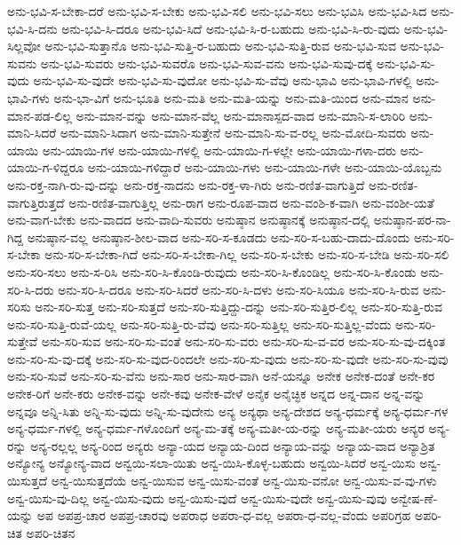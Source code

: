 {ಅನು-ಭವಿ-ಸ-ಬೇಕಾ-ದರೆ
ಅನು-ಭವಿ-ಸ-ಬೇಕು
ಅನು-ಭವಿ-ಸಲಿ
ಅನು-ಭವಿ-ಸಲು
ಅನು-ಭವಿಸಿ
ಅನು-ಭವಿ-ಸಿದ
ಅನು-ಭವಿ-ಸಿ-ದನು
ಅನು-ಭವಿ-ಸಿ-ದರೂ
ಅನು-ಭವಿ-ಸಿದೆ
ಅನು-ಭವಿ-ಸಿ-ರ-ಬಹುದು
ಅನು-ಭವಿ-ಸಿ-ರು-ವುದು
ಅನು-ಭವಿ-ಸಿಲ್ಲವೋ
ಅನು-ಭವಿ-ಸುತ್ತಾನೊ
ಅನು-ಭವಿ-ಸುತ್ತಿ-ರ-ಬಹುದು
ಅನು-ಭವಿ-ಸುತ್ತಿ-ರುವ
ಅನು-ಭವಿ-ಸುವ
ಅನು-ಭವಿ-ಸುವನು
ಅನು-ಭವಿ-ಸುವರು
ಅನು-ಭವಿ-ಸುವರೊ
ಅನು-ಭವಿ-ಸುವ-ವನು
ಅನು-ಭವಿ-ಸುವು-ದಕ್ಕೆ
ಅನು-ಭವಿ-ಸು-ವುದು
ಅನು-ಭವಿ-ಸು-ವುದೇ
ಅನು-ಭವಿ-ಸು-ವುದೋ
ಅನು-ಭವಿ-ಸು-ವೆವು
ಅನು-ಭಾವಿ
ಅನು-ಭಾವಿ-ಗಳಲ್ಲಿ
ಅನು-ಭಾವಿ-ಗಳು
ಅನು-ಭಾ-ವಿಗೆ
ಅನು-ಭೂತಿ
ಅನು-ಮತಿ
ಅನು-ಮತಿ-ಯನ್ನು
ಅನು-ಮತಿ-ಯಿಂದ
ಅನು-ಮಾನ
ಅನು-ಮಾನ-ಪಡ-ಲಿಲ್ಲ
ಅನು-ಮಾನ-ವನ್ನು
ಅನು-ಮಾನ-ವೆಲ್ಲ
ಅನು-ಮಾನಾಸ್ಪದ-ವಾದ
ಅನು-ಮಾನಿ-ಸ-ಲಾರಿರಿ
ಅನು-ಮಾನಿ-ಸಿದರೆ
ಅನು-ಮಾನಿ-ಸಿದಾಗ
ಅನು-ಮಾನಿ-ಸುತ್ತೇನೆ
ಅನು-ಮಾನಿ-ಸು-ವ-ರಲ್ಲ
ಅನು-ಮೋದಿ-ಸುವರು
ಅನು-ಯಾಯಿ
ಅನು-ಯಾಯಿ-ಗಳ
ಅನು-ಯಾಯಿ-ಗಳಲ್ಲಿ
ಅನು-ಯಾಯಿ-ಗ-ಳಲ್ಲೇ
ಅನು-ಯಾಯಿ-ಗಳಾ-ದರು
ಅನು-ಯಾಯಿ-ಗ-ಳಿದ್ದರೂ
ಅನು-ಯಾಯಿ-ಗಳಿದ್ದಾರೆ
ಅನು-ಯಾಯಿ-ಗಳು
ಅನು-ಯಾಯಿ-ಗಳೇ
ಅನು-ಯಾಯಿ-ಯೊಬ್ಬನು
ಅನು-ರಕ್ತ-ನಾಗಿ-ರು-ವು-ದನ್ನು
ಅನು-ರಕ್ತ-ನಾದನು
ಅನು-ರಕ್ತ-ಳಾ-ಗಿರು
ಅನು-ರಣಿತ-ವಾಗುತ್ತಿದೆ
ಅನು-ರಣಿತ-ವಾಗುತ್ತಿರುತ್ತದೆ
ಅನು-ರಣಿತ-ವಾಗುತ್ತಿಲ್ಲ
ಅನು-ರಾಗ
ಅನು-ರೂಪ-ವಾದ
ಅನು-ವಂಶಿ-ಕ-ವಾಗಿ
ಅನು-ವಂಶೀ-ಯತೆ
ಅನು-ವಾಗ-ಬೇಕು
ಅನು-ವಾದದ
ಅನು-ವಾದಿ-ಸುವರು
ಅನುಷ್ಠಾನ
ಅನುಷ್ಠಾನಕ್ಕೆ
ಅನುಷ್ಠಾನ-ದಲ್ಲಿ
ಅನುಷ್ಠಾನ-ಪರ-ನಾ-ಗಿದ್ದ
ಅನುಷ್ಠಾನ-ವಲ್ಲ
ಅನುಷ್ಠಾನ-ಶೀಲ-ವಾದ
ಅನು-ಸರಿ-ಸ-ಕೂಡದು
ಅನು-ಸರಿ-ಸ-ಬಹು-ದಾದು-ದೊಂದು
ಅನು-ಸರಿ-ಸ-ಬೇಕಾ
ಅನು-ಸರಿ-ಸ-ಬೇಕಾ-ಗಿದೆ
ಅನು-ಸರಿ-ಸ-ಬೇಕಾ-ಗಿಲ್ಲ
ಅನು-ಸರಿ-ಸ-ಬೇಕು
ಅನು-ಸರಿ-ಸ-ಬೇಡಿ
ಅನು-ಸರಿ-ಸಲಿ
ಅನು-ಸರಿ-ಸಲು
ಅನು-ಸ-ರಿಸಿ
ಅನು-ಸರಿ-ಸಿ-ಕೊಂಡಿ-ರುವುದು
ಅನು-ಸರಿ-ಸಿ-ಕೊಂಡಿಲ್ಲ
ಅನು-ಸರಿ-ಸಿ-ಕೊಂಡು
ಅನು-ಸರಿ-ಸಿ-ದರು
ಅನು-ಸರಿ-ಸಿ-ದರೂ
ಅನು-ಸರಿ-ಸಿದರೆ
ಅನು-ಸರಿ-ಸಿ-ದಳು
ಅನು-ಸರಿ-ಸಿಯೂ
ಅನು-ಸರಿ-ಸಿ-ರುವ
ಅನು-ಸರಿಸು
ಅನು-ಸರಿ-ಸುತ್ತ
ಅನು-ಸರಿ-ಸುತ್ತದೆ
ಅನು-ಸರಿ-ಸುತ್ತಿದ್ದು-ದನ್ನು
ಅನು-ಸರಿ-ಸುತ್ತಿರ-ಲಿಲ್ಲ
ಅನು-ಸರಿ-ಸುತ್ತಿ-ರುವ
ಅನು-ಸರಿ-ಸುತ್ತಿ-ರುವೆ-ಯಲ್ಲ
ಅನು-ಸರಿ-ಸುತ್ತಿ-ರು-ವೆವು
ಅನು-ಸರಿ-ಸುತ್ತಿಲ್ಲ
ಅನು-ಸರಿ-ಸುತ್ತಿಲ್ಲ-ವೆಂದು
ಅನು-ಸರಿ-ಸುತ್ತೇವೆ
ಅನು-ಸರಿ-ಸುವ
ಅನು-ಸರಿ-ಸು-ವಂತೆ
ಅನು-ಸರಿ-ಸು-ವರು
ಅನು-ಸರಿ-ಸು-ವ-ವರ
ಅನು-ಸರಿ-ಸು-ವು-ದಕ್ಕಿಂತ
ಅನು-ಸರಿ-ಸು-ವು-ದಕ್ಕೆ
ಅನು-ಸರಿ-ಸು-ವುದ-ರಿಂದಲೇ
ಅನು-ಸರಿ-ಸು-ವುದು
ಅನು-ಸರಿ-ಸು-ವುದೇ
ಅನು-ಸರಿ-ಸು-ವುವು
ಅನು-ಸರಿ-ಸುವೆ
ಅನು-ಸರಿ-ಸು-ವೆನು
ಅನು-ಸಾರ
ಅನು-ಸಾರ-ವಾಗಿ
ಅನೆ-ಯನ್ನೂ
ಅನೇಕ
ಅನೇಕ-ದಂತೆ
ಅನೇ-ಕರ
ಅನೇಕ-ರಿಗೆ
ಅನೇ-ಕರು
ಅನೇಕ-ವನ್ನು
ಅನೇ-ಕವು
ಅನೇಕ-ವೇಳೆ
ಅನೈಕ
ಅನೈಚ್ಛಿಕ
ಅನ್ನದ
ಅನ್ನ-ದಾನ
ಅನ್ನ-ವನ್ನು
ಅನ್ನವೂ
ಅನ್ನಿ-ಸಿತು
ಅನ್ನಿ-ಸು-ವುದು
ಅನ್ನಿ-ಸು-ವುದೇನು
ಅನ್ಯ
ಅನ್ಯಥಾ
ಅನ್ಯ-ದೇಶದ
ಅನ್ಯ-ಧರ್ಮಕ್ಕೆ
ಅನ್ಯ-ಧರ್ಮ-ಗಳ
ಅನ್ಯ-ಧರ್ಮ-ಗಳಲ್ಲಿ
ಅನ್ಯ-ಧರ್ಮ-ಗಳೊಂದಿಗೆ
ಅನ್ಯ-ಮ-ತಕ್ಕೆ
ಅನ್ಯ-ಮತೀ-ಯ-ರನ್ನು
ಅನ್ಯ-ಮತೀ-ಯರು
ಅನ್ಯರ
ಅನ್ಯ-ರನ್ನು
ಅನ್ಯ-ರಲ್ಲಲ್ಲ
ಅನ್ಯ-ರಿಂದ
ಅನ್ಯರು
ಅನ್ಯಾ-ಯದ
ಅನ್ಯಾಯ-ದಿಂದ
ಅನ್ಯಾಯ-ವನ್ನು
ಅನ್ಯಾಯ-ವಾದ
ಅನ್ಯಾಶ್ರಿತ
ಅನ್ಯೋನ್ಯ
ಅನ್ಯೋನ್ಯ-ವಾದ
ಅನ್ವಯಿ-ಸಲಾ-ಯಿತು
ಅನ್ವ-ಯಿಸಿ-ಕೊಳ್ಳ-ಬಹುದು
ಅನ್ವಯಿ-ಸಿದರೆ
ಅನ್ವ-ಯಿಸು
ಅನ್ವ-ಯಿಸುತ್ತದೆ
ಅನ್ವ-ಯಿಸುತ್ತದೆಯೆ
ಅನ್ವ-ಯಿಸುವ
ಅನ್ವ-ಯಿಸು-ವಂತೆ
ಅನ್ವ-ಯಿಸು-ವನೋ
ಅನ್ವ-ಯಿಸು-ವ-ವು-ಗಳು
ಅನ್ವ-ಯಿಸು-ವು-ದಿಲ್ಲ
ಅನ್ವ-ಯಿಸು-ವುದು
ಅನ್ವ-ಯಿಸು-ವುದೆ
ಅನ್ವ-ಯಿಸು-ವುದೇ
ಅನ್ವ-ಯಿಸು-ವುವು
ಅನ್ವೇಷ-ಣೆ-ಯನ್ನು
ಅಪ
ಅಪಪ್ರ-ಚಾರ
ಅಪಪ್ರ-ಚಾರವು
ಅಪರಾಧ
ಅಪರಾ-ಧ-ವಲ್ಲ
ಅಪರಾ-ಧ-ವಲ್ಲ-ವೆಂದು
ಅಪರಿಗ್ರಹ
ಅಪರಿ-ಚಿತ
ಅಪರಿ-ಚಿತನ
}
